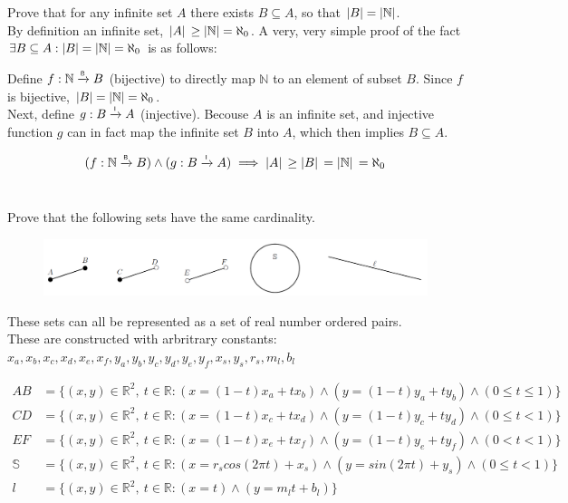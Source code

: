 \documentclass[]{article}
\newcommand{\R}{\mathbb{R}}
\newcommand{\N}{\mathbb{N}}
\newcommand{\toI}{\xrightarrow{\textsf{\tiny I}}}
\newcommand{\toB}{\xrightarrow{\textsf{\tiny B}}}
\begin{document}
\newpage
\section{}
Prove that for any infinite set $A$ there exists $B \subseteq A$, so that $\abs{B}=\abs{\N}$.\\

By definition an infinite set, $\abs*{A} \geq \abs{\N} = \aleph_0$.
A very, very simple proof of the fact $\exists B \subseteq A : \abs{B}=\abs{\N} = \aleph_0$ 
is as follows:

Define $f : \N \toB B$ (bijective) to directly map $\N$ to an element of subset $B$. 
Since $f$ is bijective, $\abs{B}=\abs{\N} = \aleph_0$.\\
Next, define $g : B \toI A$ (injective). Becouse $A$ is an infinite set, 
and injective function $g$ can in fact map the infinite set $B$ into $A$, 
which then implies $B \subseteq A$.

\begin{displaymath}
	(f : \N \toB B) \land (g : B \toI A) \implies \abs*{A} \geq \abs*{B} = \abs*{\N} = \aleph_0
\end{displaymath}


\newpage
\section{}
Prove that the following sets have the same cardinality.
\begin{figure}[h]
	\centering
	\includegraphics[width=\textwidth]{fig/pblm6.png}
\end{figure}

These sets can all be represented as a set of real number ordered pairs.\\
These are constructed with arbritrary constants: 
$x_a,x_b,x_c,x_d,x_e,x_f,y_a,y_b,y_c,y_d,y_e,y_f,x_s,y_s,r_s,m_l,b_l$

\begin{align*}
	AB &= \{(x,y) \in \R^2, \ t \in \R : 
	(x = (1-t) x_a + t x_b) \land (y = (1-t) y_a + t y_b)
	\land (0 \leq t \leq 1)\}\\
	CD &= \{(x,y) \in \R^2, \ t \in \R : 
	(x = (1-t) x_c + t x_d) \land (y = (1-t) y_c + t y_d)
	\land (0 \leq t < 1)\}\\
	EF &= \{(x,y) \in \R^2, \ t \in \R : 
	(x = (1-t) x_e + t x_f) \land (y = (1-t) y_e + t y_f)
	\land (0 < t < 1)\}\\
	\mathbb{S} &= \{(x,y) \in \R^2, \ t \in \R : 
	(x = r_s cos(2 \pi t) + x_s) \land (y = sin(2 \pi t) + y_s)
	\land (0 \leq t < 1)\}\\
	\mathit{l} &= \{(x,y) \in \R^2, \ t \in \R: (x = t) \land (y = m_l t + b_l)\}
\end{align*}
\end{document}
